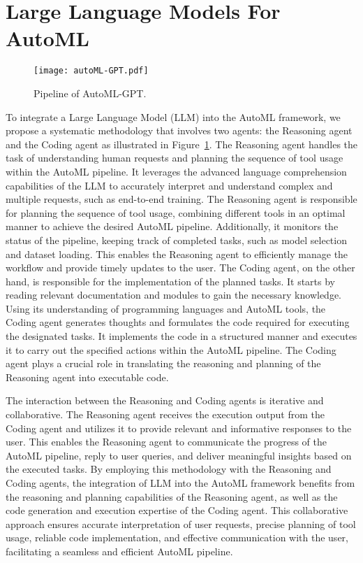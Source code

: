 \documentclass{article}
\theoremstyle{plain}
\theoremstyle{definition}
\theoremstyle{remark}
\begin{document}
\vspace{-10pt}


\section{Large Language Models For AutoML}
\begin{figure}[t!]
  \centering
  \texttt{[image: autoML-GPT.pdf]}
  \caption{Pipeline of AutoML-GPT.}
  \label{fig:autoML_pipeline}
  \vspace{-10pt}
\end{figure}
To integrate a Large Language Model (LLM) into the AutoML framework, we propose a systematic methodology that involves two agents: the Reasoning agent and the Coding agent as illustrated in Figure~\ref{fig:autoML_pipeline}. The Reasoning agent handles the task of understanding human requests and planning the sequence of tool usage within the AutoML pipeline. It leverages the advanced language comprehension capabilities of the LLM to accurately interpret and understand complex and multiple requests, such as end-to-end training. The Reasoning agent is responsible for planning the sequence of tool usage, combining different tools in an optimal manner to achieve the desired AutoML pipeline. Additionally, it monitors the status of the pipeline, keeping track of completed tasks, such as model selection and dataset loading. This enables the Reasoning agent to efficiently manage the workflow and provide timely updates to the user.
The Coding agent, on the other hand, is responsible for the implementation of the planned tasks. It starts by reading relevant documentation and modules to gain the necessary knowledge. Using its understanding of programming languages and AutoML tools, the Coding agent generates thoughts and formulates the code required for executing the designated tasks. It implements the code in a structured manner and executes it to carry out the specified actions within the AutoML pipeline. The Coding agent plays a crucial role in translating the reasoning and planning of the Reasoning agent into executable code.

The interaction between the Reasoning and Coding agents is iterative and collaborative. The Reasoning agent receives the execution output from the Coding agent and utilizes it to provide relevant and informative responses to the user. This enables the Reasoning agent to communicate the progress of the AutoML pipeline, reply to user queries, and deliver meaningful insights based on the executed tasks.
By employing this methodology with the Reasoning and Coding agents, the integration of LLM into the AutoML framework benefits from the reasoning and planning capabilities of the Reasoning agent, as well as the code generation and execution expertise of the Coding agent. This collaborative approach ensures accurate interpretation of user requests, precise planning of tool usage, reliable code implementation, and effective communication with the user, facilitating a seamless and efficient AutoML pipeline.
\end{document}
